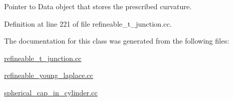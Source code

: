 Pointer to Data object that stores the prescribed curvature. 



Definition at line 221 of file refineable\+\_\+t\+\_\+junction.\+cc.



The documentation for this class was generated from the following files\+:\begin{DoxyCompactItemize}
\item 
\hyperlink{refineable__t__junction_8cc}{refineable\+\_\+t\+\_\+junction.\+cc}\item 
\hyperlink{refineable__young__laplace_8cc}{refineable\+\_\+young\+\_\+laplace.\+cc}\item 
\hyperlink{spherical__cap__in__cylinder_8cc}{spherical\+\_\+cap\+\_\+in\+\_\+cylinder.\+cc}\end{DoxyCompactItemize}
